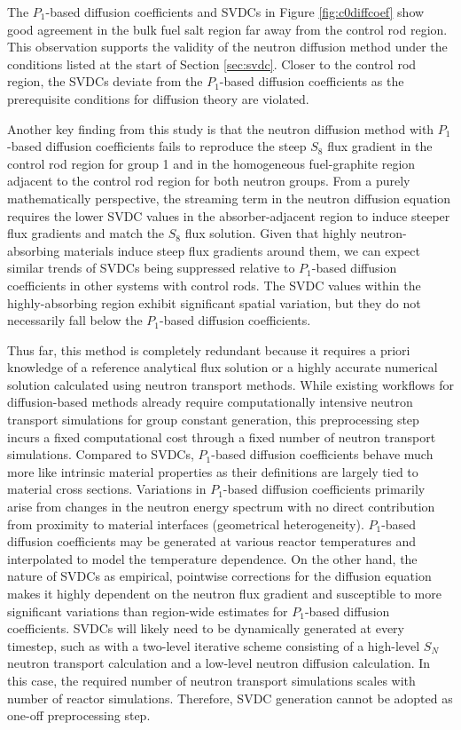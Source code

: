 The $P_1$-based diffusion coefficients and \glspl{SVDC} in Figure \ref{fig:c0diffcoef} show good
agreement in the bulk fuel salt region far away from the control rod region.
This observation supports the validity of the neutron diffusion method under the conditions
listed at the start of Section \ref{sec:svdc}. Closer to the control rod
region, the \glspl{SVDC} deviate from the $P_1$-based diffusion coefficients as the prerequisite
conditions for diffusion theory are violated.

Another key finding from this study is that the neutron diffusion method with $P_1$-based
diffusion coefficients fails to reproduce the steep $S_8$ flux gradient in the control rod region
for group 1 and in the homogeneous fuel-graphite region adjacent to the control rod region for both
neutron groups. From a purely mathematically perspective, the streaming term in the neutron
diffusion equation requires the lower
\gls{SVDC} values in the absorber-adjacent region to induce steeper flux gradients and match the
$S_8$ flux solution. Given that highly neutron-absorbing materials induce steep flux gradients
around them, we can expect similar trends of \glspl{SVDC} being suppressed relative to
$P_1$-based diffusion coefficients in other systems with control rods. The \gls{SVDC} values within
the highly-absorbing region exhibit significant spatial variation, but they do not necessarily fall
below the $P_1$-based diffusion coefficients.

Thus far, this method is completely redundant because it requires a priori knowledge of a reference
analytical flux solution or a highly accurate numerical solution calculated using neutron
transport methods. While existing workflows for diffusion-based methods already require
computationally intensive neutron transport simulations for group constant generation, this
preprocessing step incurs a fixed computational cost through
a fixed number of neutron transport simulations. Compared to \glspl{SVDC}, $P_1$-based diffusion
coefficients behave much more like intrinsic material properties as their definitions are largely
tied to material cross sections. Variations in $P_1$-based diffusion coefficients primarily arise
from changes in the neutron energy spectrum with no direct contribution from proximity to material
interfaces (geometrical heterogeneity). $P_1$-based diffusion coefficients may be generated at
various reactor temperatures and interpolated to model the temperature dependence. On the other
hand, the nature of \glspl{SVDC} as empirical, pointwise corrections for the diffusion equation
makes it highly dependent on the neutron flux gradient and susceptible to more significant
variations than region-wide estimates for $P_1$-based diffusion coefficients. \glspl{SVDC} will
likely need to be dynamically generated at every timestep, such as with a two-level iterative
scheme consisting of a high-level $S_N$ neutron transport calculation and a low-level neutron
diffusion calculation. In this case, the required number of neutron transport simulations scales
with number of reactor simulations. Therefore, \gls{SVDC} generation cannot be adopted as one-off
preprocessing step.

